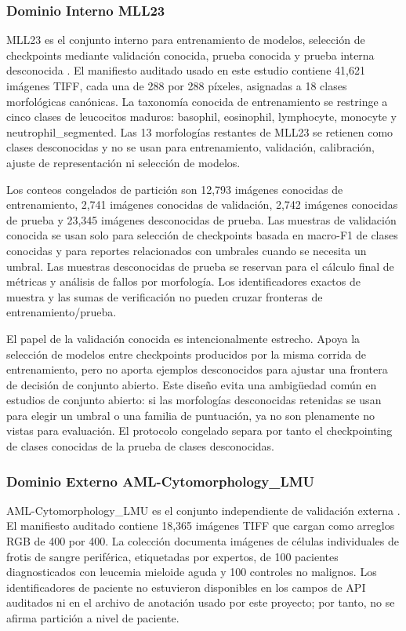\documentclass[11pt]{article}
\begin{document}
\subsubsection{Dominio Interno MLL23}

MLL23 es el conjunto interno para entrenamiento de modelos, selección de checkpoints mediante validación conocida, prueba conocida y prueba interna desconocida \cite{mll23_nature_2025,mll23_zenodo_2024}. El manifiesto auditado usado en este estudio contiene 41,621 imágenes TIFF, cada una de 288 por 288 píxeles, asignadas a 18 clases morfológicas canónicas. La taxonomía conocida de entrenamiento se restringe a cinco clases de leucocitos maduros: basophil, eosinophil, lymphocyte, monocyte y neutrophil\_segmented. Las 13 morfologías restantes de MLL23 se retienen como clases desconocidas y no se usan para entrenamiento, validación, calibración, ajuste de representación ni selección de modelos.

Los conteos congelados de partición son 12,793 imágenes conocidas de entrenamiento, 2,741 imágenes conocidas de validación, 2,742 imágenes conocidas de prueba y 23,345 imágenes desconocidas de prueba. Las muestras de validación conocida se usan solo para selección de checkpoints basada en macro-F1 de clases conocidas y para reportes relacionados con umbrales cuando se necesita un umbral. Las muestras desconocidas de prueba se reservan para el cálculo final de métricas y análisis de fallos por morfología. Los identificadores exactos de muestra y las sumas de verificación no pueden cruzar fronteras de entrenamiento/prueba.

El papel de la validación conocida es intencionalmente estrecho. Apoya la selección de modelos entre checkpoints producidos por la misma corrida de entrenamiento, pero no aporta ejemplos desconocidos para ajustar una frontera de decisión de conjunto abierto. Este diseño evita una ambigüedad común en estudios de conjunto abierto: si las morfologías desconocidas retenidas se usan para elegir un umbral o una familia de puntuación, ya no son plenamente no vistas para evaluación. El protocolo congelado separa por tanto el checkpointing de clases conocidas de la prueba de clases desconocidas.

\subsubsection{Dominio Externo AML-Cytomorphology\_LMU}

AML-Cytomorphology\_LMU es el conjunto independiente de validación externa \cite{aml_lmu_tcia_2019}. El manifiesto auditado contiene 18,365 imágenes TIFF que cargan como arreglos RGB de 400 por 400. La colección documenta imágenes de células individuales de frotis de sangre periférica, etiquetadas por expertos, de 100 pacientes diagnosticados con leucemia mieloide aguda y 100 controles no malignos. Los identificadores de paciente no estuvieron disponibles en los campos de API auditados ni en el archivo de anotación usado por este proyecto; por tanto, no se afirma partición a nivel de paciente.
\end{document}
